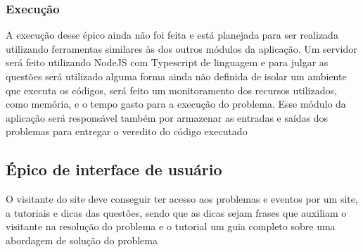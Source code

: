 \subsubsection{Execução}

A execução desse épico ainda não foi feita e está planejada para ser realizada utilizando 
ferramentas similares às dos outros módulos da aplicação. Um servidor será feito utilizando NodeJS 
com Typescript de linguagem e para julgar as questões será utilizado alguma forma ainda não 
definida de isolar um ambiente que executa os códigos, será feito um monitoramento dos recursos 
utilizados, como memória, e o tempo gasto para a execução do problema. Esse módulo da aplicação 
será responsável também por armazenar as entradas e saídas dos problemas para entregar o veredito 
do código executado

\subsection{Épico de interface de usuário}

O visitante do site deve conseguir ter acesso aos problemas e eventos por um site, a tutoriais e 
dicas das questões, sendo que as dicas sejam frases que auxiliam o visitante na resolução do 
problema e o tutorial um guia completo sobre uma abordagem de solução do problema

